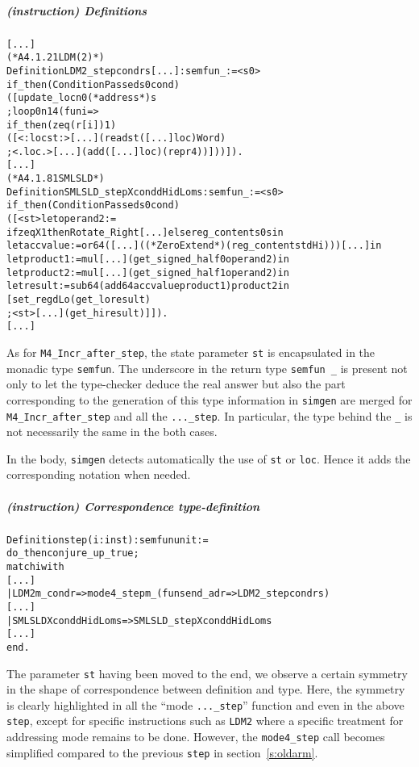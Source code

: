 \documentclass[a4paper, 11pt]{article}
\newenvironment{coq}
  {%
   \begin{alltt}
   \footnotesize} %% 8.3pl2 (April 2011)
  {\end{alltt} %
  }
\newcommand{\simgen}{{\tt simgen}\xspace}
\begin{document}
\subparagraph{(instruction) Definitions}
\begin{coq}
[...]
(* A4.1.21 LDM (2) *)
Definition LDM2_step cond r s [...] : semfun _ := <s0>
  if_then (ConditionPassed s0 cond)
    ([ update_loc n0 (*address*) s
    ; loop 0 n14 (fun i => 
         if_then (zeq (r[i]) 1)
           ([ <:loc st:> [...] (read st ([...] loc) Word)
           ; <.loc.> [...] (add ([...] loc) (repr 4)) ])) ]).
[...]
(* A4.1.81 SMLSLD *)
Definition SMLSLD_step X cond dHi dLo m s : semfun _ := <s0>
  if_then (ConditionPassed s0 cond)
    ([ <st> let operand2 := 
              if zeq X 1 then Rotate_Right [...] else reg_content s0 s in
    let accvalue := or64 ([...] ((*ZeroExtend*)(reg_content st dHi))) [...] in
    let product1 := mul [...] (get_signed_half0 operand2) in
    let product2 := mul [...] (get_signed_half1 operand2) in
    let result := sub64 (add64 accvalue product1) product2 in
    [ set_reg dLo (get_lo result)
      ; <st> [...] (get_hi result) ]]).
[...]
\end{coq}
As for \verb|M4_Incr_after_step|, the state parameter \verb|st| is encapsulated in the monadic type \verb|semfun|. The underscore in the return type \verb|semfun _| is present not only to let the type-checker deduce the real answer but also the part corresponding to the generation of this type information in \simgen are merged for \verb|M4_Incr_after_step| and all the \verb|..._step|. In particular, the type behind the \verb|_| is not necessarily the same in the both cases.

In the body, \simgen detects automatically the use of \verb|st| or \verb|loc|. Hence it adds the corresponding notation when needed.
\subparagraph{(instruction) Correspondence type-definition}
\begin{coq}
Definition step (i : inst) : semfun unit :=
  do_then conjure_up_true;
  match i with
[...]
    | LDM2 m_ cond r => mode4_step m_ (fun s end_adr => LDM2_step cond r s)
[...]
    | SMLSLD X cond dHi dLo m s => SMLSLD_step X cond dHi dLo m s
[...]
  end.
\end{coq}
The parameter \verb|st| having been moved to the end, we observe a certain symmetry in the shape of correspondence between definition and type. Here, the symmetry is clearly highlighted in all the ``mode \verb|..._step|'' function and even in the above \verb|step|, except for specific instructions such as \verb|LDM2| where a specific treatment for addressing mode remains to be done. However, the \verb|mode4_step| call becomes simplified compared to the previous \verb|step| in section~\ref{s:oldarm}.
\end{document}
